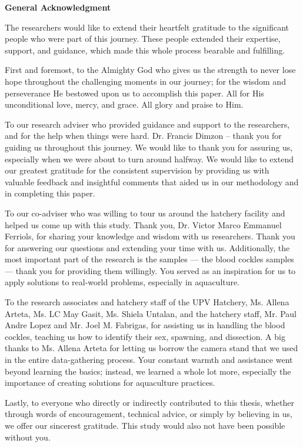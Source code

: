 \begin{center}
	\textbf{General Acknowledgment}
\end{center}
The researchers would like to extend their heartfelt gratitude to the significant people who were part of this journey. These people extended their expertise, support, and guidance, which made this whole process bearable and fulfilling.

First and foremost, to the Almighty God who gives us the strength to never lose hope throughout the challenging moments in our journey; for the wisdom and perseverance He bestowed upon us to accomplish this paper. All for His unconditional love, mercy, and grace. All glory and praise to Him.

To our research adviser who provided guidance and support to the researchers, and for the help when things were hard. Dr. Francis Dimzon – thank you for guiding us throughout this journey. We would like to thank you for assuring us, especially when we were about to turn around halfway. We would like to extend our greatest gratitude for the consistent supervision by providing us with valuable feedback and insightful comments that aided us in our methodology and in completing this paper.

To our co-adviser who was willing to tour us around the hatchery facility and helped us come up with this study. Thank you, Dr. Victor Marco Emmanuel Ferriols, for sharing your knowledge and wisdom with us researchers. Thank you for answering our questions and extending your time with us. Additionally, the most important part of the research is the samples — the blood cockles samples — thank you for providing them willingly. You served as an inspiration for us to apply solutions to real-world problems, especially in aquaculture.

To the research associates and hatchery staff of the UPV Hatchery, Ms. Allena Arteta, Ms. LC May Gasit, Ms. Shiela Untalan, and the hatchery staff, Mr. Paul Andre Lopez and Mr. Joel M. Fabrigas, for assisting us in handling the blood cockles, teaching us how to identify their sex, spawning, and dissection. A big thanks to Ms. Allena Arteta for letting us borrow the camera stand that we used in the entire data-gathering process. Your constant warmth and assistance went beyond learning the basics; instead, we learned a whole lot more, especially the importance of creating solutions for aquaculture practices.

Lastly, to everyone who directly or indirectly contributed to this thesis, whether through words of encouragement, technical advice, or simply by believing in us, we offer our sincerest gratitude. This study would also not have been possible without you.

